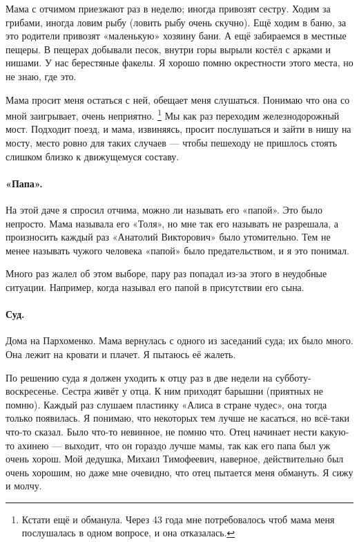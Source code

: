 \documentclass{book}
\begin{document}
Мама с отчимом приезжают раз в неделю; иногда привозят сестру.
Ходим за грибами, иногда ловим рыбу (ловить рыбу очень скучно).
Ещё ходим в баню, за это родители привозят «маленькую» хозяину бани.
А ещё забираемся в местные пещеры.
В пещерах добывали песок, внутри горы вырыли костёл с арками и нишами.
У нас берестяные факелы.
Я хорошо помню окрестности этого места, но не знаю, где это.

Мама просит меня остаться с ней, обещает меня слушаться.
Понимаю что она со мной заигрывает, очень неприятно.%
\footnote{Кстати ещё и обманула. Через 43 года мне потребовалось чтоб мама меня послушалась в одном вопросе, и она отказалась.}
Мы как раз переходим железнодорожный мост.
Подходит поезд, и мама, извиняясь, просит послушаться и зайти в нишу на мосту,
место ровно для таких случаев --- чтобы пешеходу не пришлось стоять слишком близко к движущемуся составу.

\paragraph{«Папа».}
На этой даче я спросил отчима, можно ли называть его «папой».
Это было непросто.
Мама называла его «Толя», но мне так его называть не разрешала, а произносить каждый раз «Анатолий Викторович» было утомительно.
Тем не менее называть чужого человека «папой» было предательством, и я это понимал.

Много раз жалел об этом выборе, пару раз попадал из-за этого в неудобные ситуации.
Например, когда называл его папой в присутствии его сына.

\paragraph{Суд.}
Дома на Пархоменко.
Мама вернулась с одного из заседаний суда;
их было много.
Она лежит на кровати и плачет.
Я пытаюсь её жалеть.

По решению суда я должен уходить к отцу раз в две недели на субботу-воскресенье.
Сестра живёт у отца.
К ним приходят барышни (приятных не помню).
Каждый раз слушаем пластинку «Алиса в стране чудес»,
она тогда только появилась.
Я понимаю, что некоторых тем лучше не касаться,
но всё-таки что-то сказал.
Было что-то невинное, не помню что.
Отец начинает нести какую-то ахинею ---
выходит, что он гораздо лучше мамы,
так как его папа был уж очень хорош.
Мой дедушка, Михаил Тимофеевич, наверное, действительно был очень хорошим,
но даже мне очевидно, что отец пытается меня обмануть.
Я сижу и молчу.
\end{document}
